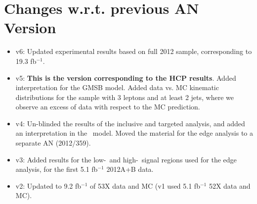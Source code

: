 \section{Changes w.r.t. previous AN Version}
\label{sec:changes}

\begin{itemize}

\item v6: Updated experimental results based on full 2012 sample, corresponding to 19.3 fb$^{-1}$.
\item v5: {\bf This is the version corresponding to the HCP results}. Added interpretation for the GMSB model. %
Added data vs. MC kinematic distributions for the sample with 3 leptons and at least 2 jets, where we observe an excess of data with respect to the MC prediction. %
\item v4: Un-blinded the results of the inclusive and targeted analysis, and added an interpretation in the \wzmet\ model. Moved the material for the edge analysis to a separate AN (2012/359).
\item v3: Added results for the low-\MET\ and high-\MET\ signal regions used for the edge analysis, for the first 5.1 fb$^{-1}$ 2012A+B data.
\item v2: Updated to 9.2 fb$^{-1}$ of 53X data and MC (v1 used 5.1 fb$^{-1}$ 52X data and MC).

\end{itemize}
